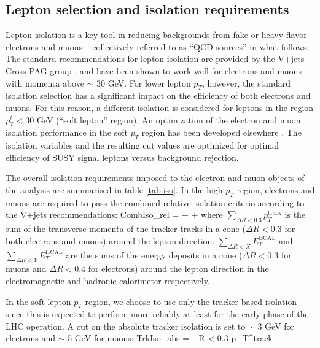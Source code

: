 \subsection{Lepton selection and isolation requirements}

Lepton isolation is a key tool in reducing backgrounds from fake or heavy-flavor electrons and muons -- collectively referred to as ``QCD sources'' in what follows. The standard recommendations for lepton isolation are provided by the V+jets Cross PAG group \cite{vjets}, and have been shown to work well for electrons and muons with momenta above $\sim$ 30 GeV. For lower lepton $p_{T}$, however, the standard isolation selection has a significant impact on the efficiency of both electrons and muons. For this reason, a different isolation is considered for leptons in the region $p_{T}^{\ell} < 30$ GeV (``soft lepton'' region). An optimization of the electron and muon isolation performance in the soft $p_{T}$ region has been developed elsewhere \cite{iso}. The isolation variables and the resulting cut values are optimized for optimal efficiency of SUSY signal leptons versus background rejection. 

The overall isolation requirements imposed to the electron and muon objects of the analysis are summarised in table \ref{tab:iso}. In the high $p_{T}$ region, electrons and muons are required to pass the combined relative isolation criterio according to the V+jets recommendations:
\bea
\textrm{CombIso}_{rel} =  +   +  
\eea
where $\sum_{\Delta R < 0.3} p_{T}^{\textrm{track}}$ is the sum of the transverse momenta of the tracker-tracks in a cone ($\Delta R < 0.3$ for both electrons and muons) around the lepton direction. $\sum_{\Delta R < X} E_T^{\textrm{ECAL}}$ and $\sum_{\Delta R < Y} E_T^{\textrm{HCAL}}$ are the
sums of the energy deposits in a cone ($\Delta R < 0.3$ for muons and $\Delta R < 0.4$ for electrons) around the lepton direction in the electromagnetic and hadronic calorimeter respectively.

In the soft lepton $p_{T}$ region, we choose to use only the tracker based isolation since this is expected to perform more reliably at least for the early phase of the LHC operation. A cut on the absolute tracker isolation is set to $\sim$ 3 GeV for electrons and $\sim$ 5 GeV for muons:
\bea
\textrm{TrkIso}_{\textrm{abs}} = \sum_{\Delta R < 0.3} p_{T}^{\textrm{track}}
\eea

